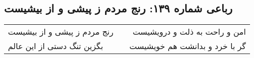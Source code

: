 \begin{center}
\section*{رباعی شماره ۱۳۹: رنج مردم ز پیشی و از بیشیست}
\label{sec:sh139}
\begin{longtable}{l p{0.5cm} r}
رنج مردم ز پیشی و از بیشیست
&&
امن و راحت به ذلت و درویشیست
\\
بگزین تنگ دستی از این عالم
&&
گر با خرد و بدانشت هم خویشیست
\\
\end{longtable}
\end{center}
